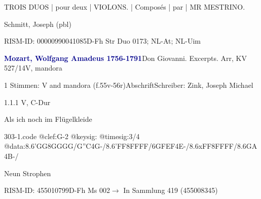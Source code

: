 \documentclass[twocolumn]{book}
\begin{document}
\par \begin{itshape}TROIS DUOS | pour deux | VIOLONS. | Composés | par | MR MESTRINO.\end{itshape} \newline Schmitt, Joseph  (pbl)
\par RISM-ID: 00000990041085\newline D-Fh  Str Duo 0173; NL-At; NL-Uim
\par \vspace{7pt} \textcolor{darkblue}{\textbf{Mozart, Wolfgang Amadeus  1756-1791}}\hfillplus{\textbf{[303]}}\newline Don Giovanni. Excerpts. Arr, KV 527/14\newline V, mandora
\par \begin{itshape}\end{itshape} 
\par \textcolor{darkblue}{}  1 Stimmen: V and mandora  (f.55v-56r)\newline Abschrift\newline Schreiber: Zink, Joseph Michael
\par 1.1.1  V, C-Dur\newline \begin{footnotesize} Als ich noch im Flügelkleide \end{footnotesize}  
\begin{filecontents*}{303-1.code}
@clef:G-2
@keysig:
@timesig:3/4
@data:8.6'GG8GGGG/{G''C}4G-/8.6'FF8FFFF/{6GFEF}4E-/8.6xFF8FFFF/{8.6GA}4B-/
\end{filecontents*}
\newline
%
\par Neun Strophen
\par RISM-ID: 455010799\newline D-Fh  Ms 002\newline $\rightarrow$ In Sammlung 419 (455008345)
      
\end{document}
